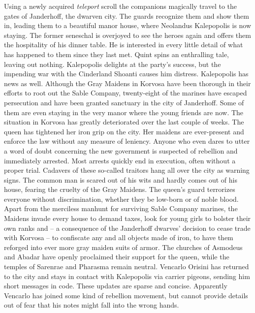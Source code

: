 Using a newly acquired {\itshape teleport} scroll the companions magically travel to the gates of Janderhoff, the dwarven city. The guards recognize them and show them in, leading them to a beautiful manor house, where Neolandus Kalepopolis is now staying. The former seneschal is overjoyed to see the heroes again and offers them the hospitality of his dinner table. He is interested in every little detail of what has happened to them since they last met. Quint spins an enthralling tale, leaving out nothing. Kalepopolis delights at the party's success, but the impending war with the Cinderland Shoanti causes him distress. Kalepopolis has news as well. Although the Gray Maidens in Korvosa have been thorough in their efforts to root out the Sable Company, twenty-eight of the marines have escaped persecution and have been granted sanctuary in the city of Janderhoff. Some of them are even staying in the very manor where the young friends are now. The situation in Korvosa has greatly deteriorated over the last couple of weeks. The queen has tightened her iron grip on the city. Her maidens are ever-present and enforce the law without any measure of leniency. Anyone who even dares to utter a word of doubt concerning the new government is suspected of rebellion and immediately arrested. Most arrests quickly end in execution, often without a proper trial. Cadavers of these so-called traitors hang all over the city as warning signs. The common man is scared out of his wits and hardly comes out of his house, fearing the cruelty of the Gray Maidens. The queen's guard terrorizes everyone without discrimination, whether they be low-born or of noble blood. Apart from the merciless manhunt for surviving Sable Company marines, the Maidens invade every house to demand taxes, look for young girls to bolster their own ranks and -- a consequence of the Janderhoff dwarves' decision to cease trade with Korvosa -- to confiscate any and all objects made of iron, to have them reforged into ever more gray maiden suits of armor. The churches of Asmodeus and Abadar have openly proclaimed their support for the queen, while the temples of Sarenrae and Pharasma remain neutral. Vencarlo Orisini has returned to the city and stays in contact with Kalepopolis via carrier pigeons, sending him short messages in code. These updates are sparse and concise. Apparently Vencarlo has joined some kind of rebellion movement, but cannot provide details out of fear that his notes might fall into the wrong hands.\\

